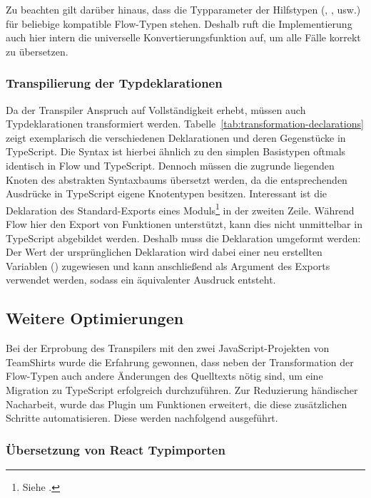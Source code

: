 Zu beachten gilt darüber hinaus, dass die Typparameter der Hilfstypen (, ,  usw.) für beliebige kompatible Flow-Typen stehen. Deshalb ruft die Implementierung auch hier intern die universelle Konvertierungsfunktion  auf, um alle Fälle korrekt zu übersetzen.

\subsubsection{Transpilierung der Typdeklarationen}

Da der Transpiler Anspruch auf Vollständigkeit erhebt, müssen auch Typdeklarationen transformiert werden. Tabelle~\ref{tab:transformation-declarations} zeigt exemplarisch die verschiedenen Deklarationen und deren Gegenstücke in TypeScript. Die Syntax ist hierbei ähnlich zu den simplen Basistypen oftmals identisch in Flow und TypeScript. Dennoch müssen die zugrunde liegenden Knoten des abstrakten Syntaxbaums übersetzt werden, da die entsprechenden Ausdrücke in TypeScript eigene Knotentypen besitzen. Interessant ist die Deklaration des Standard-Exports eines Moduls\footnote{Siehe \autocite[377]{ECMASCRIPT:2019}.} in der zweiten Zeile. Während Flow hier den Export von Funktionen unterstützt, kann dies nicht unmittelbar in TypeScript abgebildet werden. Deshalb muss die Deklaration umgeformt werden: Der Wert der ursprünglichen Deklaration wird dabei einer neu erstellten Variablen () zugewiesen und kann anschließend als Argument des Exports verwendet werden, sodass ein äquivalenter Ausdruck entsteht.

\tablespace


\subsection{Weitere Optimierungen}
\label{sec:optimizations}

Bei der Erprobung des Transpilers mit den zwei JavaScript-Projekten von TeamShirts wurde die Erfahrung gewonnen, dass neben der Transformation der Flow-Typen auch andere Änderungen des Quelltexts nötig sind, um eine Migration zu TypeScript erfolgreich durchzuführen. Zur Reduzierung händischer Nacharbeit, wurde das Plugin um Funktionen erweitert, die diese zusätzlichen Schritte automatisieren. Diese werden nachfolgend ausgeführt.

\subsubsection{Übersetzung von React Typimporten}
\label{sec:react-type-import-mapping}


